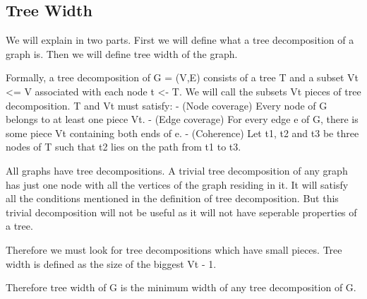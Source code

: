 \hypertarget{tree-width}{%
\subsection{Tree Width}\label{tree-width}}

We will explain in two parts. First we will define what a tree
decomposition of a graph is. Then we will define tree width of the
graph.

Formally, a tree decomposition of G = (V,E) consists of a tree T and a
subset Vt \textless= V associated with each node t \textless- T. We will
call the subsets Vt pieces of tree decomposition. T and Vt must satisfy:
- (Node coverage) Every node of G belongs to at least one piece Vt. -
(Edge coverage) For every edge e of G, there is some piece Vt containing
both ends of e. - (Coherence) Let t1, t2 and t3 be three nodes of T such
that t2 lies on the path from t1 to t3.

All graphs have tree decompositions. A trivial tree decomposition of any
graph has just one node with all the vertices of the graph residing in
it. It will satisfy all the conditions mentioned in the definition of
tree decomposition. But this trivial decomposition will not be useful as
it will not have seperable properties of a tree.

Therefore we must look for tree decompositions which have small pieces.
Tree width is defined as the size of the biggest Vt - 1.

Therefore tree width of G is the minimum width of any tree decomposition
of G.
